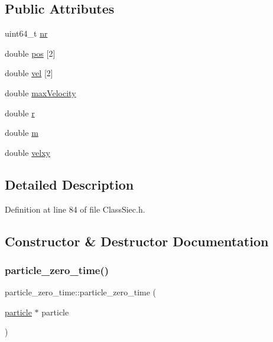 \subsection*{Public Attributes}
\begin{DoxyCompactItemize}
\item 
uint64\+\_\+t \mbox{\hyperlink{structparticle__zero__time_a866e480ab047b43e3654d6843aa44276}{nr}}
\item 
double \mbox{\hyperlink{structparticle__zero__time_a6101461222bc79283b8c8a59cb6e7dee}{pos}} \mbox{[}2\mbox{]}
\item 
double \mbox{\hyperlink{structparticle__zero__time_a02135214c123f6cbc5ca706cdf47c890}{vel}} \mbox{[}2\mbox{]}
\item 
double \mbox{\hyperlink{structparticle__zero__time_a1162e81c9a3fca1545c7ed2b7a1a6140}{max\+Velocity}}
\item 
double \mbox{\hyperlink{structparticle__zero__time_a06f14406f824aaf0c0cd61054876fd56}{r}}
\item 
double \mbox{\hyperlink{structparticle__zero__time_ae75f971e47e3bd12789383dd352a2fa6}{m}}
\item 
double \mbox{\hyperlink{structparticle__zero__time_a09c3ed1201f81f88c5719da195c3c7d1}{velxy}}
\end{DoxyCompactItemize}


\subsection{Detailed Description}


Definition at line 84 of file Class\+Siec.\+h.



\subsection{Constructor \& Destructor Documentation}
\mbox{\label{structparticle__zero__time_ac3abaccc3579eddbe304718deac0bcd0}} 
\subsubsection{\texorpdfstring{particle\+\_\+zero\+\_\+time()}{particle\_zero\_time()}}
{\footnotesize\ttfamily particle\+\_\+zero\+\_\+time\+::particle\+\_\+zero\+\_\+time (\begin{DoxyParamCaption}\item[{\mbox{\hyperlink{structparticle}{particle}} $\ast$}]{particle }\end{DoxyParamCaption})}

